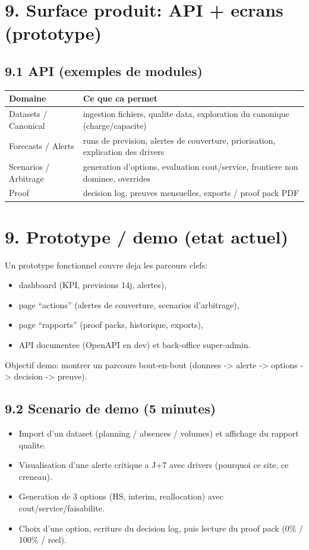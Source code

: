 \documentclass[11pt,a4paper]{article}
\begin{document}
\section*{9. Surface produit: API + ecrans (prototype)}
\subsection*{9.1 API (exemples de modules)}
\begin{tabularx}{\textwidth}{@{}lX@{}}
\toprule
\textbf{Domaine} & \textbf{Ce que ca permet} \\
\midrule
Datasets / Canonical & ingestion fichiers, qualite data, exploration du canonique (charge/capacite) \\
Forecasts / Alerts & runs de prevision, alertes de couverture, priorisation, explication des drivers \\
Scenarios / Arbitrage & generation d'options, evaluation cout/service, frontiere non dominee, overrides \\
Proof & decision log, preuves mensuelles, exports / proof pack PDF \\
\bottomrule
\end{tabularx}

\section*{9. Prototype / demo (etat actuel)}
Un prototype fonctionnel couvre deja les parcours clefs:
\begin{itemize}
  \item dashboard (KPI, previsions 14j, alertes),
  \item page ``actions'' (alertes de couverture, scenarios d'arbitrage),
  \item page ``rapports'' (proof packs, historique, exports),
  \item API documentee (OpenAPI en dev) et back-office super-admin.
\end{itemize}
Objectif demo: montrer un parcours bout-en-bout (donnees -> alerte -> options -> decision -> preuve).

\subsection*{9.2 Scenario de demo (5 minutes)}
\begin{itemize}
  \item Import d'un dataset (planning / absences / volumes) et affichage du rapport qualite.
  \item Visualisation d'une alerte critique a J+7 avec drivers (pourquoi ce site, ce creneau).
  \item Generation de 3 options (HS, interim, reallocation) avec cout/service/faisabilite.
  \item Choix d'une option, ecriture du decision log, puis lecture du proof pack (0\% / 100\% / reel).
\end{itemize}
\end{document}
